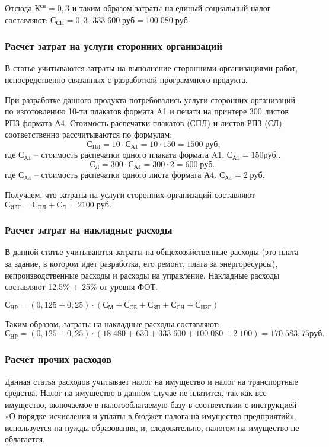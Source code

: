 Отсюда  $К^{сн} = 0,3$  и таким образом затраты на единый социальный налог составляют: $С_{СН} = 0,3  \cdot 333 \; 600  \; руб = 100 \; 080 \; руб.$

\subsubsection{Расчет затрат на услуги сторонних организаций} 

В статье учитываются затраты на выполнение сторонними организациями работ, непосредственно связанных с разработкой программного продукта.

При разработке данного продукта потребовались услуги сторонних организаций по изготовлению 10-ти плакатов формата A1 и печати на принтере 300 листов РПЗ формата А4.  Стоимость распечатки плакатов  (СПЛ) и листов РПЗ (СЛ) соответственно  рассчитываются  по формулам:
$$С_{ПЛ} =10 \cdot С_{А1} = 10 \cdot 150 = 1500 \; руб,$$
где $С_{А1}$ – стоимость распечатки одного плаката формата A1.   $С_{А1}  = 150 руб.$.
$$С_Л =300 \cdot С_{А4} = 300 \cdot 2 = 600 \; руб.,$$
где $С_{А4}$ – стоимость распечатки одного листа  формата А4. $С_{А4}  = 2 \; руб.$

Получаем, что затраты на услуги сторонних организаций составляют
$С_{ИЗГ}= С_{ПЛ} + С_Л = 2100 \; руб.$

\subsubsection{Расчет затрат на накладные расходы}
В данной статье учитываются затраты на общехозяйственные расходы (это плата за здание, в котором идет разработка, его ремонт, плата за энергоресурсы), непроизводственные расходы и расходы на управление.
Накладные расходы составляют 12,5\% + 25\% от уровня ФОТ.
 
$С_{НР}  =(0,125+0,25) \cdot (С_М + С_{ОБ} + С_{ЗП} + С_{СН} + С_{ИЗГ})$

Таким образом,  затраты на накладные расходы составляют:  
$С_{НР}  = (0,125+0,25) \cdot (18 \; 480+ 630 + 333 \; 600+ 100 \; 080 + 2 \; 100) =170 \; 583,75 руб.$

\subsubsection{Расчет прочих расходов}

Данная статья расходов учитывает налог на имущество и налог на транспортные средства. Налог на имущество в данном случае не платится, так как  все имущество, включаемое в налогооблагаемую базу в соответствии с инструкцией «О порядке исчисления и уплаты в бюджет налога на имущество предприятий», используется на нужды образования, и, следовательно, налогом на имущество не облагается.

